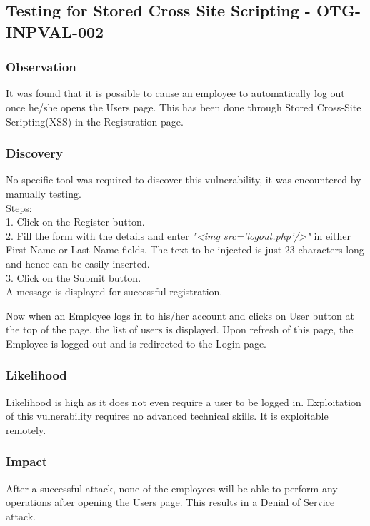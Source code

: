 \subsection{Testing for Stored Cross Site Scripting - OTG-INPVAL-002}

\subsubsection{Observation}
It was found that it is possible to cause an employee to automatically log out once he/she opens the Users page. This has been done through Stored Cross-Site Scripting(XSS) in the Registration page.

\subsubsection{Discovery}
No specific tool was required to discover this vulnerability, it was encountered by manually testing.\\
Steps: \\
1. Click on the Register button. \\
2. Fill the form with the details and enter \textit{"<img src='logout.php'/>"} in either First Name or Last Name fields. The text to be injected is just 23 characters long and hence can be easily inserted.\\
3. Click on the Submit button. \\
A message is displayed for successful registration.

Now when an Employee logs in to his/her account and clicks on User button at the top of the page, the list of users is displayed. Upon refresh of this page, the Employee is logged out and is redirected to the Login page.

\subsubsection{Likelihood}
Likelihood is high as it does not even require a user to be logged in.
Exploitation of this vulnerability requires no advanced technical skills. It is exploitable remotely.

\subsubsection{Impact}
After a successful attack, none of the employees will be able to perform any operations after opening the Users page. This results in a Denial of Service attack.

